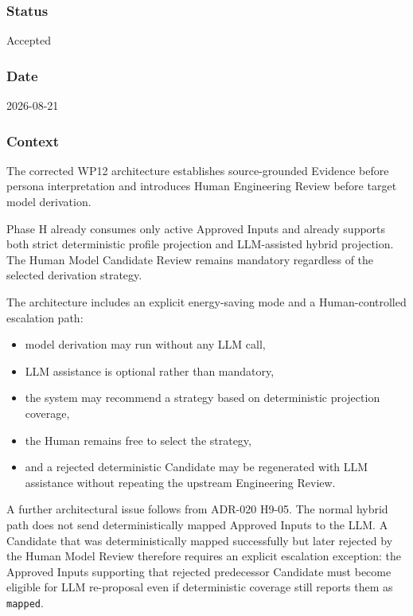 \hypertarget{status-9}{%
\subsubsection{Status}\label{status-9}}

Accepted

\hypertarget{date-9}{%
\subsubsection{Date}\label{date-9}}

2026-08-21

\hypertarget{context-13}{%
\subsubsection{Context}\label{context-13}}

The corrected WP12 architecture establishes source-grounded Evidence before persona interpretation and introduces Human Engineering Review before target model derivation.

Phase H already consumes only active Approved Inputs and already supports both strict deterministic profile projection and LLM-assisted hybrid projection. The Human Model Candidate Review remains mandatory regardless of the selected derivation strategy.

The architecture includes an explicit energy-saving mode and a Human-controlled escalation path:

\begin{itemize}
\tightlist
\item
  model derivation may run without any LLM call,
\item
  LLM assistance is optional rather than mandatory,
\item
  the system may recommend a strategy based on deterministic projection coverage,
\item
  the Human remains free to select the strategy,
\item
  and a rejected deterministic Candidate may be regenerated with LLM assistance without repeating the upstream Engineering Review.
\end{itemize}

A further architectural issue follows from ADR-020 H9-05. The normal hybrid path does not send deterministically mapped Approved Inputs to the LLM. A Candidate that was deterministically mapped successfully but later rejected by the Human Model Review therefore requires an explicit escalation exception: the Approved Inputs supporting that rejected predecessor Candidate must become eligible for LLM re-proposal even if deterministic coverage still reports them as \texttt{mapped}.

